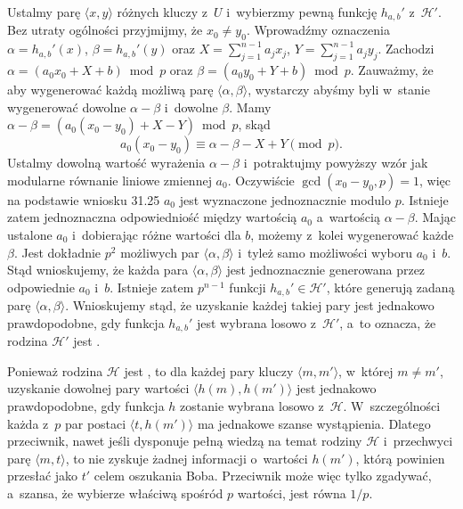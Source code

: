 \subproblem %
Ustalmy parę $\langle x,y\rangle$ różnych kluczy z~$U$ i~wybierzmy pewną funkcję $h_{a,b}'$ z~$\mathcal{H}'$.
Bez utraty ogólności przyjmijmy, że $x_0\ne y_0$.
Wprowadźmy oznaczenia $\alpha=h_{a,b}'(x)$, $\beta=h_{a,b}'(y)$ oraz $X=\sum_{j=1}^{n-1}a_jx_j$, $Y=\sum_{j=1}^{n-1}a_jy_j$.
Zachodzi $\alpha=(a_0x_0+X+b)\bmod p$ oraz $\beta=(a_0y_0+Y+b)\bmod p$.
Zauważmy, że aby wygenerować każdą możliwą parę $\langle\alpha,\beta\rangle$, wystarczy abyśmy byli w~stanie wygenerować dowolne $\alpha-\beta$ i~dowolne $\beta$.
Mamy $\alpha-\beta=(a_0(x_0-y_0)+X-Y)\bmod p$, skąd
\[
	a_0(x_0-y_0) \equiv \alpha-\beta-X+Y \pmod p.
\]
Ustalmy dowolną wartość wyrażenia $\alpha-\beta$ i~potraktujmy powyższy wzór jak modularne równanie liniowe zmiennej $a_0$.
Oczywiście $\gcd(x_0-y_0,p)=1$, więc na podstawie wniosku 31.25 $a_0$ jest wyznaczone jednoznacznie modulo $p$.
Istnieje zatem jednoznaczna odpowiedniość między wartością $a_0$ a~wartością $\alpha-\beta$.
Mając ustalone $a_0$ i~dobierając różne wartości dla $b$, możemy z~kolei wygenerować każde $\beta$.
Jest dokładnie $p^2$ możliwych par $\langle\alpha,\beta\rangle$ i~tyleż samo możliwości wyboru $a_0$ i~$b$.
Stąd wnioskujemy, że każda para $\langle\alpha,\beta\rangle$ jest jednoznacznie generowana przez odpowiednie $a_0$ i~$b$.
Istnieje zatem $p^{n-1}$ funkcji $h_{a,b}'\in\mathcal{H}'$, które generują zadaną parę $\langle\alpha,\beta\rangle$.
Wnioskujemy stąd, że uzyskanie każdej takiej pary jest jednakowo prawdopodobne, gdy funkcja $h_{a,b}'$ jest wybrana losowo z~$\mathcal{H}'$, a~to oznacza, że rodzina $\mathcal{H}'$ jest .

\subproblem %
Ponieważ rodzina $\mathcal{H}$ jest , to dla każdej pary kluczy $\langle m,m'\rangle$, w~której $m\ne m'$, uzyskanie dowolnej pary wartości $\langle h(m),h(m')\rangle$ jest jednakowo prawdopodobne, gdy funkcja $h$ zostanie wybrana losowo z~$\mathcal{H}$.
W~szczególności każda z~$p$ par postaci $\langle t,h(m')\rangle$ ma jednakowe szanse wystąpienia.
Dlatego przeciwnik, nawet jeśli dysponuje pełną wiedzą na temat rodziny $\mathcal{H}$ i~przechwyci parę $\langle m,t\rangle$, to nie zyskuje żadnej informacji o~wartości $h(m')$, którą powinien przesłać jako $t'$ celem oszukania Boba.
Przeciwnik może więc tylko zgadywać, a~szansa, że wybierze właściwą spośród $p$ wartości, jest równa $1/p$.

\endinput

